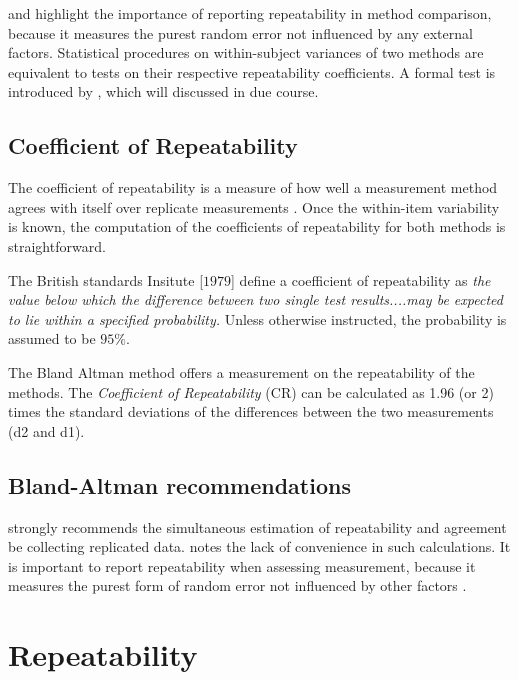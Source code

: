 \documentclass[12pt, a4paper]{article}
\begin{document}
\citet{barnhart} and \citet{roy} highlight the importance of reporting repeatability in method comparison, because it measures the purest random error not influenced by any external factors. Statistical procedures on within-subject variances of two methods are equivalent to tests on their respective repeatability coefficients. A formal test is introduced by \citet{roy}, which will discussed in due course.

\subsection{Coefficient of Repeatability}
The coefficient of repeatability is a measure of how well a
measurement method agrees with itself over replicate measurements
\citep{BA99}. Once the within-item variability is known, the
computation of the coefficients of repeatability for both methods
is straightforward.

The British standards Insitute [$1979$] define a coefficient of
repeatability  as \emph{the value below which the difference between two single test results....may be expected to lie within a specified probability.} Unless otherwise instructed, the
probability is assumed to be $95\%$. 

	The Bland Altman method offers a measurement on the repeatability of the methods. The \emph{Coefficient of Repeatability} (CR) can be calculated as 1.96 (or 2) times the standard deviations of the differences between the two measurements (d2 and d1).

\subsection{Bland-Altman recommendations}
\citet{BA99} strongly recommends the simultaneous estimation of repeatability and agreement be collecting replicated data. \citet{ARoy2009} notes the lack of convenience in such calculations.
It is important to report repeatability when assessing measurement, because it measures the purest form of random error not influenced by other factors \citep{Barnhart}.	


	
	


\newpage
\section{Repeatability}
\end{document}
